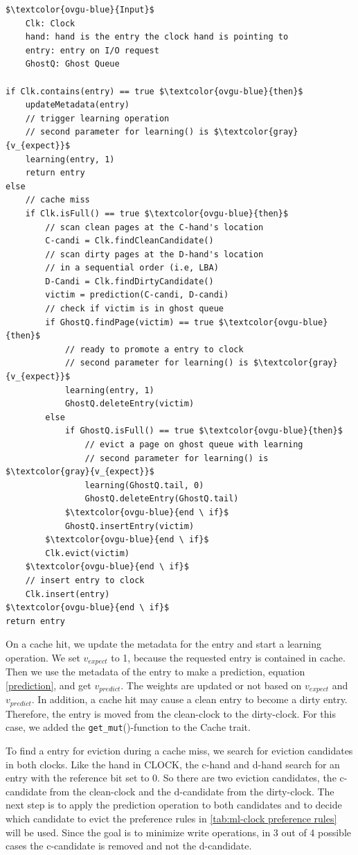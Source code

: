 \documentclass[
	12pt,
	a4paper,
	abstract,
	bibliography=totoc,
	chapterprefix,
	headings=openright,
	numbers=endperiod,
	parskip=half,
	twoside,
]{scrreprt}
\begin{document}
\begin{lstlisting}[mathescape=true,caption={ML-CLOCK replacement algorithm in pseudocode, slightly modified from \cite{jiang2005clock}},label=lst:ml-clock-algorithm]
$\textcolor{ovgu-blue}{Input}$
	Clk: Clock
	hand: hand is the entry the clock hand is pointing to
	entry: entry on I/O request
	GhostQ: Ghost Queue

if Clk.contains(entry) == true $\textcolor{ovgu-blue}{then}$
	updateMetadata(entry)
	// trigger learning operation
	// second parameter for learning() is $\textcolor{gray}{v_{expect}}$
	learning(entry, 1)
	return entry
else
	// cache miss
	if Clk.isFull() == true $\textcolor{ovgu-blue}{then}$
		// scan clean pages at the C-hand's location
		C-candi = Clk.findCleanCandidate()
		// scan dirty pages at the D-hand's location
		// in a sequential order (i.e, LBA)
		D-Candi = Clk.findDirtyCandidate()
		victim = prediction(C-candi, D-candi)
		// check if victim is in ghost queue
		if GhostQ.findPage(victim) == true $\textcolor{ovgu-blue}{then}$
			// ready to promote a entry to clock
			// second parameter for learning() is $\textcolor{gray}{v_{expect}}$
			learning(entry, 1)
			GhostQ.deleteEntry(victim)
		else
			if GhostQ.isFull() == true $\textcolor{ovgu-blue}{then}$
				// evict a page on ghost queue with learning
				// second parameter for learning() is $\textcolor{gray}{v_{expect}}$
				learning(GhostQ.tail, 0)
				GhostQ.deleteEntry(GhostQ.tail)
			$\textcolor{ovgu-blue}{end \ if}$
			GhostQ.insertEntry(victim)
		$\textcolor{ovgu-blue}{end \ if}$
		Clk.evict(victim)
	$\textcolor{ovgu-blue}{end \ if}$
	// insert entry to clock
	Clk.insert(entry)
$\textcolor{ovgu-blue}{end \ if}$
return entry 
\end{lstlisting}

On a cache hit, we update the metadata for the entry and start a learning operation.
We set $v_{expect}$ to 1, because the requested entry is contained in cache.
Then we use the metadata of the entry to make a prediction, equation \ref{prediction}, and get $v_{predict}$.
The weights are updated or not based on $v_{expect}$ and $v_{predict}$.
In addition, a cache hit may cause a clean entry to become a dirty entry.
Therefore, the entry is moved from the clean-clock to the dirty-clock.
For this case, we added the \texttt{get\_mut}()-function to the Cache trait.

To find a entry for eviction during a cache miss, 
we search for eviction candidates in both clocks.
Like the hand in CLOCK, the c-hand and d-hand search for an entry with the reference bit set to 0.
So there are two eviction candidates, the c-candidate from the clean-clock and the d-candidate from the dirty-clock.
The next step is to apply the prediction operation to both candidates and to decide which candidate to evict the preference 
rules in \cref{tab:ml-clock preference rules} will be used.
Since the goal is to minimize write operations, in 3 out of 4 possible cases the c-candidate is removed and not the d-candidate.
\end{document}
